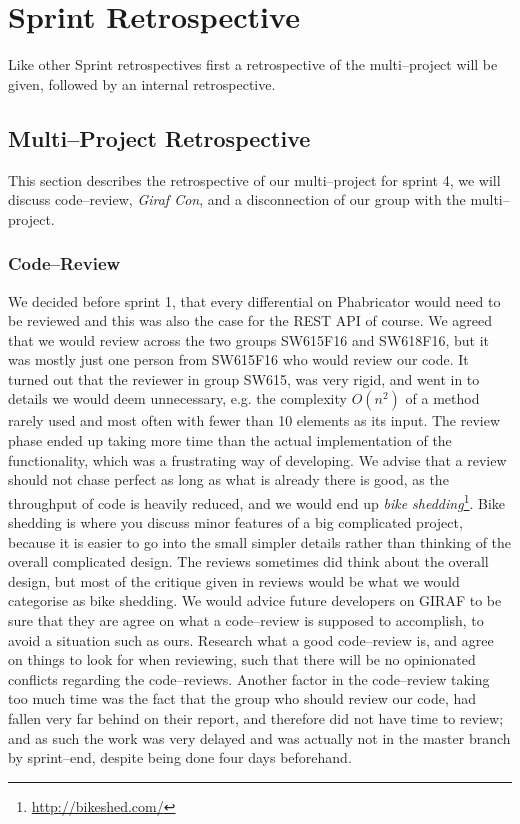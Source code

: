 \section{Sprint Retrospective}\label{sec:S4retro}

Like other Sprint retrospectives first a retrospective of the multi--project will be given, followed by an internal retrospective.

\subsection{Multi--Project Retrospective}
This section describes the retrospective of our multi--project for sprint 4, we will discuss code--review, \textit{Giraf Con}, and a disconnection of our group with the multi--project.

\subsubsection*{Code--Review}
We decided before sprint 1, that every differential on Phabricator would need to be reviewed and this was also the case for the REST API of course.
We agreed that we would review across the two groups SW615F16 and SW618F16, but it was mostly just one person from SW615F16 who would review our code.
It turned out that the reviewer in group SW615, was very rigid, and went in to details we would deem unnecessary, e.g. the complexity $O(n^2)$ of a method rarely used and most often with fewer than 10 elements as its input.
The review phase ended up taking more time than the actual implementation of the functionality, which was a frustrating way of developing.
We advise that a review should not chase perfect as long as what is already there is good, as the throughput of code is heavily reduced, and we would end up \textit{bike shedding}\footnote{\url{http://bikeshed.com/}}.
Bike shedding is where you discuss minor features of a big complicated project, because it is easier to go into the small simpler details rather than thinking of the overall complicated design.
The reviews sometimes did think about the overall design, but most of the critique given in reviews would be what we would categorise as bike shedding.
We would advice future developers on GIRAF to be sure that they are agree on what a code--review is supposed to accomplish, to avoid a situation such as ours.
Research what a good code--review is, and agree on things to look for when reviewing, such that there will be no opinionated conflicts regarding the code--reviews.
Another factor in the code--review taking too much time was the fact that the group who should review our code, had fallen very far behind on their report, and therefore did not have time to review; and as such the work was very delayed and was actually not in the master branch by sprint--end, despite being done four days beforehand.

